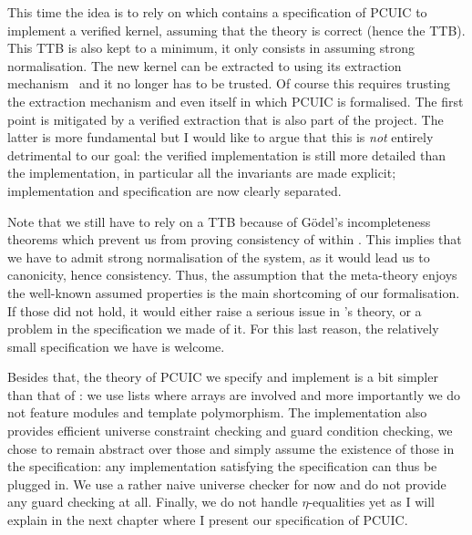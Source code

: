 This time the idea is to rely on \MetaCoq which contains a specification of
\acrshort{PCUIC} to implement a verified kernel, assuming that the theory is
correct (hence the \acrshort{TTB}).
This \acrshort{TTB} is also kept to a minimum, it only consists in assuming
strong normalisation.
The new kernel can be extracted to \Coq using its extraction
mechanism~ and it no longer has to be trusted. Of course this
requires trusting the extraction mechanism and even \Coq itself in which
\acrshort{PCUIC} is formalised.
The first point is mitigated by a verified extraction that is also part of the
project. The latter is more fundamental but I would like to argue that this is
\emph{not} entirely detrimental to our goal: the verified implementation is
still more detailed than the \ocaml implementation, in particular all the
invariants are made explicit; implementation and specification are now clearly
separated.

Note that we still have to rely on a \acrshort{TTB} because of Gödel's
incompleteness theorems which prevent us from proving consistency of
\Coq within \Coq.
This implies that we have to admit strong normalisation of the system, as it
would lead us to canonicity, hence consistency.
Thus, the assumption that the meta-theory enjoys the well-known assumed
properties is the main shortcoming of our formalisation. If those did not hold,
it would either raise a serious issue in \Coq's theory, or a problem in the
specification we made of it. For this last reason, the relatively small
specification we have is welcome.

Besides that, the theory of \acrshort{PCUIC} we specify and implement is a bit
simpler than that of \Coq: we use lists where arrays are involved and more
importantly we do not feature modules and template polymorphism.
The implementation also provides efficient universe constraint checking and
guard condition checking, we chose to remain abstract over those and simply
assume the existence of those in the specification: any implementation
satisfying the specification can thus be plugged in. We use a rather naive
universe checker for now and do not provide any guard checking at all.
Finally, we do not handle \(\eta\)-equalities yet as I will explain in the next
chapter where I present our specification of \acrshort{PCUIC}.